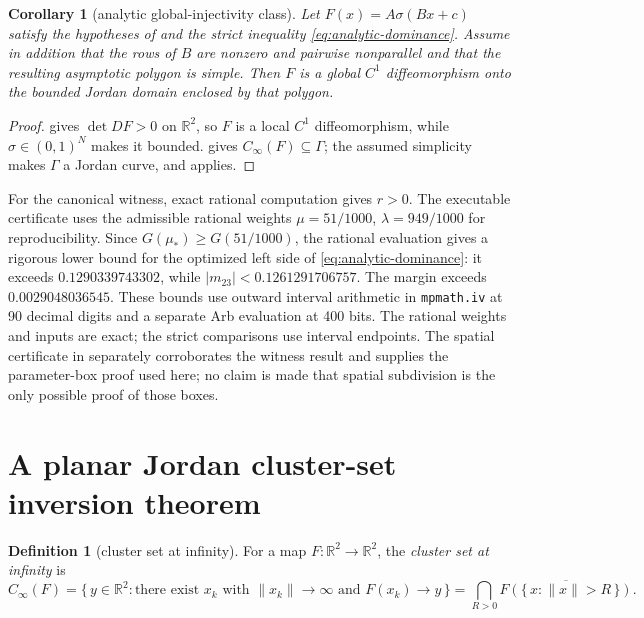 \documentclass[11pt,twoside,leqno]{article}
\theoremstyle{plain}
\newtheorem{corollary}[corollary]{Corollary}
\theoremstyle{definition}
\newtheorem{definition}[definition]{Definition}
\theoremstyle{remark}
\newcommand{\R}{\mathbb{R}}
\newcommand{\norm}[1]{\lVert #1 \rVert}
\newcommand{\clinf}{C_{\infty}}
\begin{document}
\begin{corollary}[analytic global-injectivity class]\label{cor:analytic-class}
Let $F(x)=A\sigma(Bx+c)$ satisfy the hypotheses of  and the strict inequality \eqref{eq:analytic-dominance}. Assume in addition that the rows of $B$ are nonzero and pairwise nonparallel and that the resulting asymptotic polygon is simple. Then $F$ is a global $C^1$ diffeomorphism onto the bounded Jordan domain enclosed by that polygon.
\end{corollary}
\begin{proof}
 gives $\det DF>0$ on $\R^2$, so $F$ is a local $C^1$ diffeomorphism, while $\sigma\in(0,1)^N$ makes it bounded.  gives $\clinf(F)\subseteq\Gamma$; the assumed simplicity makes $\Gamma$ a Jordan curve, and  applies.
\end{proof}

For the canonical witness, exact rational computation gives $r>0$.  The executable certificate uses the admissible rational weights $\mu=51/1000$, $\lambda=949/1000$ for reproducibility.  Since $G(\mu_*)\ge G(51/1000)$, the rational evaluation gives a rigorous lower bound for the optimized left side of \eqref{eq:analytic-dominance}: it exceeds $0.1290339743302$, while $|m_{23}|<0.1261291706757$.  The margin exceeds $0.0029048036545$. These bounds use outward
interval arithmetic in \texttt{mpmath.iv} at 90 decimal digits and a separate
Arb evaluation at 400 bits. The rational weights and inputs are exact; the
strict comparisons use interval endpoints. The spatial certificate in
 separately corroborates the witness result and supplies the
parameter-box proof used here; no claim is made that spatial subdivision is
the only possible proof of those boxes.

\section{A planar Jordan cluster-set inversion theorem}\label{sec:theorem}

\begin{definition}[cluster set at infinity]\label{def:clinf}
For a map $F:\R^2\to\R^2$, the \emph{cluster set at infinity} is
\[
\clinf(F)=\bigl\{\,y\in\R^2 : \text{there exist } x_k \text{ with }
\norm{x_k}\to\infty \text{ and } F(x_k)\to y \,\bigr\}
=\bigcap_{R>0}\overline{F(\{\,x:\norm{x}>R\,\})}.
\]
\end{definition}
\end{document}
